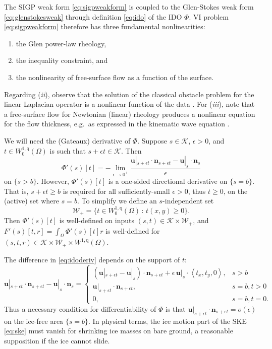\documentclass[letterpaper,final,12pt,reqno]{amsart}
\theoremstyle{claim}
\newcommand{\eps}{\epsilon}
\newcommand{\bn}{\mathbf{n}}
\newcommand{\bu}{\mathbf{u}}
\newcommand{\qq}{{\text{q}}}
\newcommand{\bus}{\bu|_s}
\numberwithin{equation}{section}
\numberwithin{figure}{section}
\numberwithin{table}{section}
\numberwithin{theorem}{section}
\begin{document}
The SIGP weak form \eqref{eq:sigpweakform} is coupled to the Glen-Stokes weak form \eqref{eq:glenstokesweak} through definition \eqref{eq:ido} of the IDO $\Phi$.  VI problem \eqref{eq:sigpweakform} therefore has three fundamental nonlinearities:
\renewcommand{\labelenumi}{(\emph{\roman{enumi}})}
\begin{enumerate}
\item the Glen power-law rheology,
\item the inequality constraint, and
\item the nonlinearity of free-surface flow as a function of the surface.
\end{enumerate}
Regarding (\emph{ii}), observe that the solution of the classical obstacle problem for the linear Laplacian operator is a nonlinear function of the data \cite{KinderlehrerStampacchia1980}.  For (\emph{iii}), note that a free-surface flow for Newtonian (linear) rheology produces a nonlinear equation for the flow thickness, e.g.~as expressed in the kinematic wave equation \cite{Ockendonetal2003}.

We will need the (Gateaux) derivative of $\Phi$.  Suppose $s\in \mathcal{K}$, $\eps>0$, and $t \in W_0^{1,\qq}(\Omega)$ is such that $s+\eps t \in \mathcal{K}$.  Then
\begin{equation}
\Phi'(s)[t] = - \lim_{\eps\to 0^+} \frac{\bu|_{s+\eps t} \cdot \bn_{s+\eps t} - \bus \cdot \bn_s}{\eps} \label{eq:idoderiv}
\end{equation}
on $\{s>b\}$.  However, $\Phi'(s)[t]$ is a one-sided directional derivative on $\{s=b\}$.  That is, $s+\eps t\ge b$ is required for all sufficiently-small $\eps>0$, thus $t\ge 0$, on the (active) set where $s=b$.  To simplify we define an $s$-independent set
\begin{equation}
\mathcal{W}_+ = \{t \in W_0^{1,\qq}(\Omega) \,:\, t(x,y) \ge 0\}. \label{eq:infdefectset}
\end{equation}
Then $\Phi'(s)[t]$ is well-defined on inputs $(s,t) \in \mathcal{K} \times \mathcal{W}_+$, and $F'(s)[t,r]=\int_\Omega \Phi'(s)[t] r$ is well-defined for $(s,t,r) \in \mathcal{K} \times \mathcal{W}_+ \times W^{1,\qq}(\Omega)$.

The difference in \eqref{eq:idoderiv} depends on the support of $t$:
\begin{equation}
\bu|_{s+\eps t} \cdot \bn_{s+\eps t} - \bus \cdot \bn_s = \begin{cases}
           (\bu|_{s+\eps t} - \bus) \cdot \bn_{s+\eps t} + \eps\, \bus \cdot \left<t_x,t_y,0\right>, & s > b \\
           \bu|_{s+\eps t} \cdot \bn_{s+\eps t}, & s=b, t > 0 \\
           0, & s=b, t = 0.
                 \end{cases} \label{eq:differencecases}
\end{equation}
Thus a necessary condition for differentiability of $\Phi$ is that $\bu|_{s+\eps t} \cdot \bn_{s+\eps t} = o(\eps)$ on the ice-free area $\{s=b\}$.  In physical terms, the ice motion part of the SKE \eqref{eq:ske} must vanish for shrinking ice masses on bare ground, a reasonable supposition if the ice cannot slide.
\end{document}
